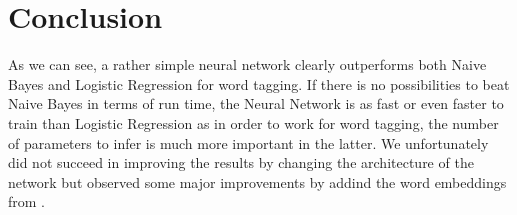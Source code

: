 \documentclass[11pt]{article}
\begin{document}
\section{Conclusion}

As we can see, a rather simple neural network clearly outperforms both Naive Bayes and Logistic Regression for word tagging. If there is no possibilities to beat Naive Bayes in terms of run time, the Neural Network is as fast or even faster to train than Logistic Regression as in order to work for word tagging, the number of parameters to infer is much more important in the latter. We unfortunately did not succeed in improving the results by changing the architecture of the network but observed some major improvements by addind the word embeddings from \cite{pennington}.





\end{document}
